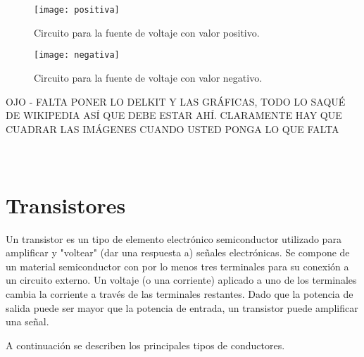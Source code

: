 \documentclass{scrartcl}
\begin{document}
\begin{figure}[h!]
	\centering
	\texttt{[image: positiva]}
	\caption{Circuito para la fuente de voltaje con valor positivo.}
	\label{fig: fuente positiva}
\end{figure}

\begin{figure}[h!]
	\centering
	\texttt{[image: negativa]}
	\caption{Circuito para la fuente de voltaje con valor negativo.}
	\label{fig: fuente negativa}
\end{figure}
	
OJO - FALTA PONER LO DELKIT Y LAS GRÁFICAS, TODO LO SAQUÉ DE WIKIPEDIA ASÍ QUE DEBE ESTAR AHÍ. CLARAMENTE HAY QUE CUADRAR LAS IMÁGENES CUANDO USTED PONGA LO QUE FALTA\\\\\\

\section{Transistores}

Un transistor es un tipo de elemento electrónico semiconductor utilizado para amplificar y "voltear" (dar una respuesta a) señales electrónicas. Se compone de un material semiconductor con por lo menos tres terminales para su conexión a un circuito externo. Un voltaje (o una corriente) aplicado a uno de los terminales cambia la corriente a través de las terminales restantes. Dado que la potencia de salida puede ser mayor que la potencia de entrada, un transistor puede amplificar una señal.

A continuación se describen los principales tipos de conductores.
\end{document}

